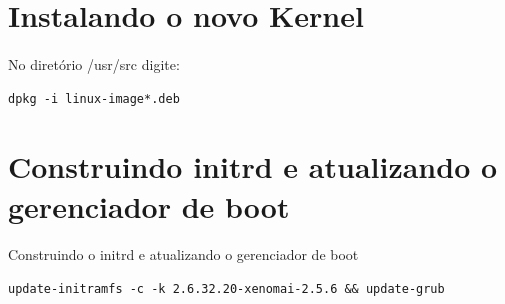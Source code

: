 \documentclass[a4paper,10pt]{article}
\begin{document}
\section{Instalando o novo Kernel}
  \paragraph{}
  No diretório /usr/src digite:
	{\small  \begin{verbatim}dpkg -i linux-image*.deb\end{verbatim}     }


\section{Construindo initrd e atualizando o gerenciador de boot}
  \paragraph{}
  Construindo o initrd e atualizando o gerenciador de boot
	{\small  \begin{verbatim}update-initramfs -c -k 2.6.32.20-xenomai-2.5.6 && update-grub\end{verbatim}     } 
\end{document}
